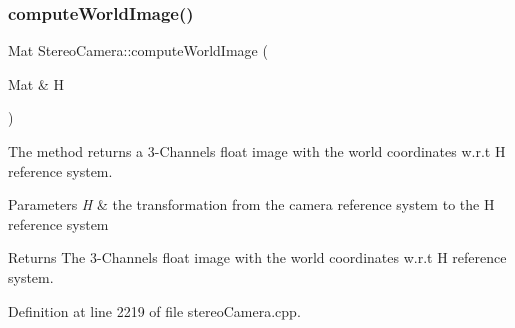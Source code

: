 \begin{DoxyCode}{0}

\end{DoxyCode}
\mbox{\label{classStereoCamera_a52ef2f3401488e5c4fa6badd1336f96d}} 
\subsubsection{\texorpdfstring{computeWorldImage()}{computeWorldImage()}}
{\footnotesize\ttfamily Mat Stereo\+Camera\+::compute\+World\+Image (\begin{DoxyParamCaption}\item[{Mat \&}]{H }\end{DoxyParamCaption})}



The method returns a 3-\/Channels float image with the world coordinates w.\+r.\+t H reference system. 


\begin{DoxyParams}{Parameters}
{\em H} & the transformation from the camera reference system to the H reference system \\
\hline
\end{DoxyParams}
\begin{DoxyReturn}{Returns}
The 3-\/Channels float image with the world coordinates w.\+r.\+t H reference system. 
\end{DoxyReturn}


Definition at line 2219 of file stereo\+Camera.\+cpp.


